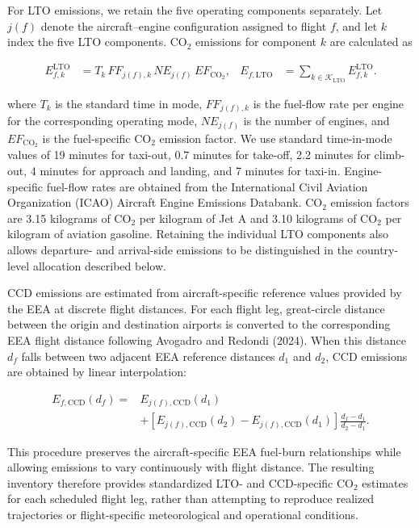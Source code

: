\documentclass[12pt]{article}
\begin{document}
For LTO emissions, we retain the five operating components separately. Let $j(f)$ denote the aircraft--engine configuration assigned to flight $f$, and let $k$ index the five LTO components. CO$_2$ emissions for component $k$ are calculated as

\begin{equation}
\begin{aligned}
E_{f,k}^{\mathrm{LTO}}
&=
T_k
\,FF_{j(f),k}
\,NE_{j(f)}
\,EF_{\mathrm{CO_2}},
&
E_{f,\mathrm{LTO}}
&=
\sum_{k\in\mathcal K_{\mathrm{LTO}}}
E_{f,k}^{\mathrm{LTO}}.
\end{aligned}
\label{eq:nature_2}
\end{equation}

where $T_k$ is the standard time in mode, $FF_{j(f),k}$ is the fuel-flow rate per engine for the corresponding operating mode, $NE_{j(f)}$ is the number of engines, and $EF_{\mathrm{CO_2}}$ is the fuel-specific CO$_2$ emission factor. We use standard time-in-mode values of 19 minutes for taxi-out, 0.7 minutes for take-off, 2.2 minutes for climb-out, 4 minutes for approach and landing, and 7 minutes for taxi-in. Engine-specific fuel-flow rates are obtained from the International Civil Aviation Organization (ICAO) Aircraft Engine Emissions Databank. CO$_2$ emission factors are 3.15 kilograms of CO$_2$ per kilogram of Jet A and 3.10 kilograms of CO$_2$ per kilogram of aviation gasoline. Retaining the individual LTO components also allows departure- and arrival-side emissions to be distinguished in the country-level allocation described below.

CCD emissions are estimated from aircraft-specific reference values provided by the EEA at discrete flight distances. For each flight leg, great-circle distance between the origin and destination airports is converted to the corresponding EEA flight distance following Avogadro and Redondi (2024). When this distance $d_f$ falls between two adjacent EEA reference distances $d_1$ and $d_2$, CCD emissions are obtained by linear interpolation:

\begin{equation}
\begin{split}
E_{f,\mathrm{CCD}}(d_f)
={}&
E_{j(f),\mathrm{CCD}}(d_1)\\
&+
\left[
E_{j(f),\mathrm{CCD}}(d_2)
-
E_{j(f),\mathrm{CCD}}(d_1)
\right]
\frac{d_f-d_1}{d_2-d_1}.
\end{split}
\label{eq:nature_3}
\end{equation}

This procedure preserves the aircraft-specific EEA fuel-burn relationships while allowing emissions to vary continuously with flight distance. The resulting inventory therefore provides standardized LTO- and CCD-specific CO$_2$ estimates for each scheduled flight leg, rather than attempting to reproduce realized trajectories or flight-specific meteorological and operational conditions.
\end{document}
